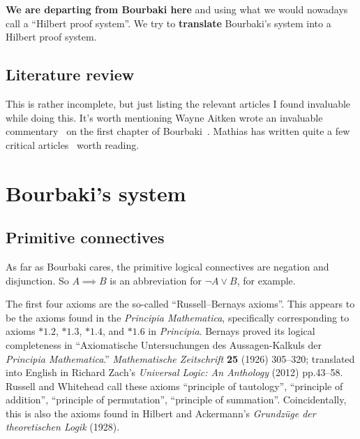 \documentclass{amsart}%
\begin{document}
\textbf{We are departing from Bourbaki here} and using what we would
nowadays call a ``Hilbert proof system''. We try to \textbf{translate}
Bourbaki's system into a Hilbert proof system.

\subsection{Literature review} This is rather incomplete, but just
listing the relevant articles I found invaluable while doing this.
It's worth mentioning Wayne Aitken wrote an invaluable
commentary~\cite{aitken2023} on the first chapter of
Bourbaki~\cite{bourbaki1970sets}. Mathias has written quite a few
critical articles~\cite{mathias1992ignorance,mathias2002term,mathias2014hilbert}
worth reading.


\section{Bourbaki's system}

\subsection{Primitive connectives}
As far as Bourbaki cares, the primitive logical connectives are negation
and disjunction. So $A\implies B$ is an abbreviation for $\neg A\lor B$,
for example.

\begin{remark}
The first four axioms are the so-called ``Russell--Bernays axioms''.
This appears to be the axioms found in the
\textit{Principia Mathematica}, specifically corresponding to axioms
$*1.2$, $*1.3$, $*1.4$, and $*1.6$ in \textit{Principia}. Bernays proved
its logical completeness in ``Axiomatische Untersuchungen des
Aussagen-Kalkuls der \textit{Principia Mathematica}.''
\textit{Mathematische Zeitschrift} \textbf{25} (1926) 305--320;
translated into English in Richard Zach's \textit{Universal Logic: An
  Anthology} (2012) pp.43--58. Russell and Whitehead call these axioms
``principle of tautology'', ``principle of addition'',
``principle of permutation'', ``principle of
summation''. Coincidentally, this is also the axioms found in Hilbert
and Ackermann's \textit{Grundz\"{u}ge der theoretischen Logik} (1928).
\end{remark}
\end{document}
